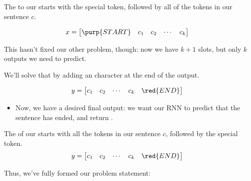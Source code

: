         \begin{definition}
            The  to our  starts with the special  token, followed by all of the tokens in our sentence $c$.

            \begin{equation*}
                x = \begin{bmatrix}
                    \purp{START} & c_1 & c_2 & \cdots & c_k
                \end{bmatrix}
            \end{equation*}
        \end{definition}

    \subsecdiv

        This hasn't fixed our other problem, though: now we have $k+1$ slots, but only $k$ outputs we need to predict.

        We'll solve that by adding an  character at the end of the output.

        \begin{equation}
            y = \begin{bmatrix}
                c_1 & c_2 & \cdots & c_k & \red{END}
            \end{bmatrix}
        \end{equation}

        \begin{itemize}
            \item Now, we have a desired final output: we want our RNN to predict that the sentence has ended, and return .\\
        \end{itemize}

        \begin{definition}
            The  of our  starts with all the tokens in our sentence $c$, followed by the special  token.
            \begin{equation*}
                y = \begin{bmatrix}
                    c_1 & c_2 & \cdots & c_k & \red{END}
                \end{bmatrix}
            \end{equation*}
        
        \end{definition}

        Thus, we've fully formed our problem statement:\\


